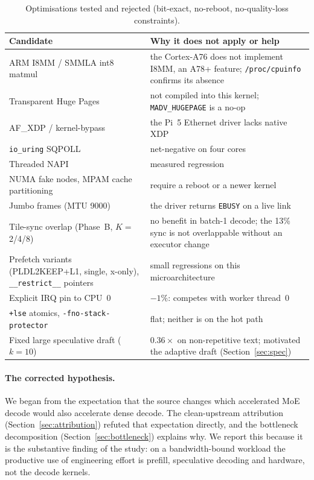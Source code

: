 \documentclass[10pt,a4paper]{article}
\begin{document}
\begin{table}[H]
\centering\small
\caption{Optimisations tested and rejected (bit-exact, no-reboot, no-quality-loss constraints).}
\label{tab:deadends}
\begin{tabularx}{\textwidth}{p{4.6cm}X}
\toprule
\textbf{Candidate} & \textbf{Why it does not apply or help} \\
\midrule
ARM I8MM / SMMLA int8 matmul & the Cortex-A76 does not implement I8MM, an A78+ feature; \texttt{/proc/cpuinfo} confirms its absence \\
Transparent Huge Pages & not compiled into this kernel; \texttt{MADV\_HUGEPAGE} is a no-op \\
AF\_XDP / kernel-bypass & the Pi~5 Ethernet driver lacks native XDP \\
\texttt{io\_uring} SQPOLL & net-negative on four cores \\
Threaded NAPI & measured regression \\
NUMA fake nodes, MPAM cache partitioning & require a reboot or a newer kernel \\
Jumbo frames (MTU 9000) & the driver returns \texttt{EBUSY} on a live link \\
Tile-sync overlap (Phase~B, $K{=}$2/4/8) & no benefit in batch-1 decode; the 13\% sync is not overlappable without an executor change \\
Prefetch variants (PLDL2KEEP+L1, single, x-only), \texttt{\_\_restrict\_\_} pointers & small regressions on this microarchitecture \\
Explicit IRQ pin to CPU~0 & $-1\%$: competes with worker thread~0 \\
\texttt{+lse} atomics, \texttt{-fno-stack-protector} & flat; neither is on the hot path \\
Fixed large speculative draft ($k{=}10$) & $0.36\times$ on non-repetitive text; motivated the adaptive draft (Section~\ref{sec:spec}) \\
\bottomrule
\end{tabularx}
\end{table}

\paragraph{The corrected hypothesis.} We began from the expectation that the source changes which accelerated MoE decode would also accelerate dense decode. The clean-upstream attribution (Section~\ref{sec:attribution}) refuted that expectation directly, and the bottleneck decomposition (Section~\ref{sec:bottleneck}) explains why. We report this because it is the substantive finding of the study: on a bandwidth-bound workload the productive use of engineering effort is prefill, speculative decoding and hardware, not the decode kernels.
\end{document}
